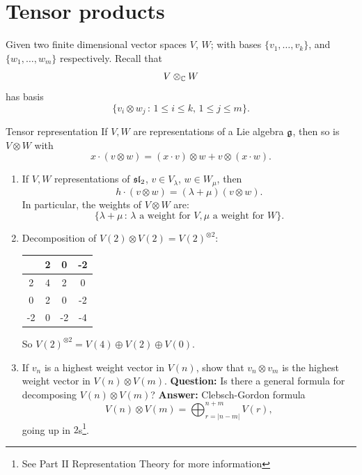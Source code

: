 \documentclass{article}
\begin{document}
\section{Tensor products}
Given two finite dimensional vector spaces $V$, $W$; with bases $\{v_{1},\dots, v_{k}\}$, and $\{w_{1},\dots,w_{m}\}$ respectively. Recall that \[ V \otimes_{\mathbb{C}} W\] has basis \[ \{v_{i} \otimes w_{j} \, : \, 1\leq i \leq k, \, 1 \leq j \leq m\}.\]
\begin{fancydefine}{Tensor representation}
    If $V,W$ are representations of a Lie algebra $\mathfrak{g}$, then so is $V \otimes W$ with \[ x\cdot(v \otimes w) = (x \cdot v) \otimes w + v \otimes (x \cdot w).\]
\end{fancydefine}
\begin{exs}\hspace{0.1cm}
    \begin{enumerate}
    \item[(1)] If $V,W$ representations of $\mathfrak{sl}_{2}$, $v \in V_{\lambda}$, $w \in W_{\mu}$, then \[ h \cdot (v \otimes w) = (\lambda + \mu)(v \otimes w).\] In particular, the weights of $V \otimes W$ are: \[ \{ \lambda + \mu \, : \, \lambda \text{ a weight for } V, \mu \text{ a weight for } W\}.\]
    \item[(2)] Decomposition of $V(2) \otimes V(2) = V(2)^{\otimes 2}$:
    \begin{center}
        \begin{tabular}{c | c c c }
                & 2 & 0 & -2 \\ \hline
                2 & 4 & 2 & 0 \\ 
                0 & 2 & 0 & -2\\
                -2 & 0 & -2 & -4
        \end{tabular}
    \end{center}
    So $V(2)^{\otimes 2} = V(4) \oplus V(2) \oplus V(0)$.
    \item[(3)] If $v_{n}$ is a highest weight vector in $V(n)$, show that $v_{n} \otimes v_{m}$ is the highest weight vector in $V(n) \otimes V(m)$. \gap \textbf{Question: }Is there a general formula for decomposing $V(n) \otimes V(m)$?\gap
    \textbf{Answer: } Clebsch-Gordon formula \[V(n) \otimes V(m) = \bigoplus_{r=|n-m|}^{n+m} V(r),\] going up in $2$s\footnote{See Part II Representation Theory for more information}.
    \end{enumerate}



\end{exs}
\end{document}
